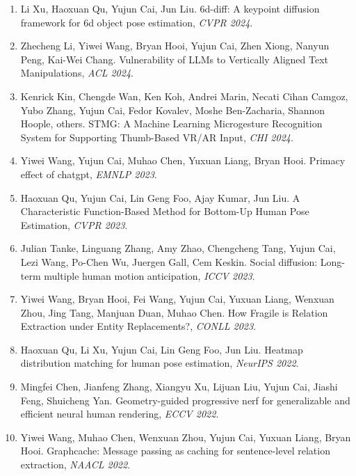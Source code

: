 \begin{enumerate}
\item Li Xu, Haoxuan Qu, Yujun Cai, Jun Liu. 6d-diff: A keypoint diffusion framework for 6d object pose estimation, \textit{CVPR 2024}.

\item Zhecheng Li, Yiwei Wang, Bryan Hooi, Yujun Cai, Zhen Xiong, Nanyun Peng, Kai-Wei Chang. Vulnerability of LLMs to Vertically Aligned Text Manipulations, \textit{ACL 2024}.

\item Kenrick Kin, Chengde Wan, Ken Koh, Andrei Marin, Necati Cihan Camgoz, Yubo Zhang, Yujun Cai, Fedor Kovalev, Moshe Ben-Zacharia, Shannon Hoople, others. STMG: A Machine Learning Microgesture Recognition System for Supporting Thumb-Based VR/AR Input, \textit{CHI 2024}.

\item Yiwei Wang, Yujun Cai, Muhao Chen, Yuxuan Liang, Bryan Hooi. Primacy effect of chatgpt, \textit{EMNLP 2023}.

\item Haoxuan Qu, Yujun Cai, Lin Geng Foo, Ajay Kumar, Jun Liu. A Characteristic Function-Based Method for Bottom-Up Human Pose Estimation, \textit{CVPR 2023}.

\item Julian Tanke, Linguang Zhang, Amy Zhao, Chengcheng Tang, Yujun Cai, Lezi Wang, Po-Chen Wu, Juergen Gall, Cem Keskin. Social diffusion: Long-term multiple human motion anticipation, \textit{ICCV 2023}.

\item Yiwei Wang, Bryan Hooi, Fei Wang, Yujun Cai, Yuxuan Liang, Wenxuan Zhou, Jing Tang, Manjuan Duan, Muhao Chen. How Fragile is Relation Extraction under Entity Replacements?, \textit{CONLL 2023}.

\item Haoxuan Qu, Li Xu, Yujun Cai, Lin Geng Foo, Jun Liu. Heatmap distribution matching for human pose estimation, \textit{NeurIPS 2022}.

\item Mingfei Chen, Jianfeng Zhang, Xiangyu Xu, Lijuan Liu, Yujun Cai, Jiashi Feng, Shuicheng Yan. Geometry-guided progressive nerf for generalizable and efficient neural human rendering, \textit{ECCV 2022}.

\item Yiwei Wang, Muhao Chen, Wenxuan Zhou, Yujun Cai, Yuxuan Liang, Bryan Hooi. Graphcache: Message passing as caching for sentence-level relation extraction, \textit{NAACL 2022}.


\end{enumerate}
